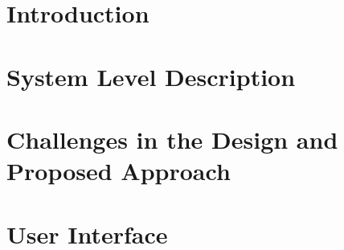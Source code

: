 

\chapter{Introduction}\label{ch:introduction}
\setcounter{page}{1}


\chapter{System Level Description}\label{ch:description}


\chapter{Challenges in the Design and Proposed Approach}\label{ch:challenges}


\chapter{User Interface}\label{ch:UI}


%
